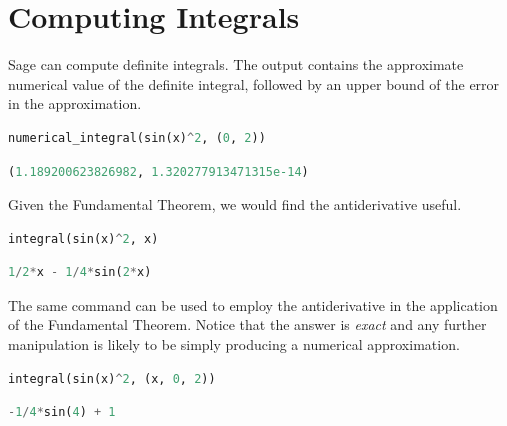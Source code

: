 \documentclass[10pt,]{article}
\theoremstyle{plain}
\theoremstyle{definition}
\begin{document}
\section{Computing Integrals}\label{section-3}
%
Sage can compute definite integrals.  The output contains the approximate numerical value of the definite integral, followed by an upper bound  of the error in the approximation.
%
\begin{lstlisting}[language=Python,breaklines=true,breakatwhitespace=true,basicstyle=\small\ttfamily,columns=fixed,frame=single,frameround=tttt,backgroundcolor=\color{blue!10},xleftmargin=4ex,xrightmargin=4ex]
numerical_integral(sin(x)^2, (0, 2))
\end{lstlisting}
%
\begin{lstlisting}[language=Python,breaklines=true,breakatwhitespace=true,basicstyle=\small\ttfamily,columns=fixed,xleftmargin=8ex,xrightmargin=4ex]
(1.189200623826982, 1.320277913471315e-14)
\end{lstlisting}
%
\par Given the Fundamental Theorem, we would find the antiderivative useful.
%
\begin{lstlisting}[language=Python,breaklines=true,breakatwhitespace=true,basicstyle=\small\ttfamily,columns=fixed,frame=single,frameround=tttt,backgroundcolor=\color{blue!10},xleftmargin=4ex,xrightmargin=4ex]
integral(sin(x)^2, x)
\end{lstlisting}
%
\begin{lstlisting}[language=Python,breaklines=true,breakatwhitespace=true,basicstyle=\small\ttfamily,columns=fixed,xleftmargin=8ex,xrightmargin=4ex]
1/2*x - 1/4*sin(2*x)
\end{lstlisting}
%
\par The same command can be used to employ the antiderivative in the application of the Fundamental Theorem.  Notice that the answer is \emph{exact} and any further manipulation is likely to be simply producing a numerical approximation.
%
\begin{lstlisting}[language=Python,breaklines=true,breakatwhitespace=true,basicstyle=\small\ttfamily,columns=fixed,frame=single,frameround=tttt,backgroundcolor=\color{blue!10},xleftmargin=4ex,xrightmargin=4ex]
integral(sin(x)^2, (x, 0, 2))
\end{lstlisting}
%
\begin{lstlisting}[language=Python,breaklines=true,breakatwhitespace=true,basicstyle=\small\ttfamily,columns=fixed,xleftmargin=8ex,xrightmargin=4ex]
-1/4*sin(4) + 1
\end{lstlisting}
%
\typeout{************************************************}
\typeout{************************************************}
%
\end{document}
